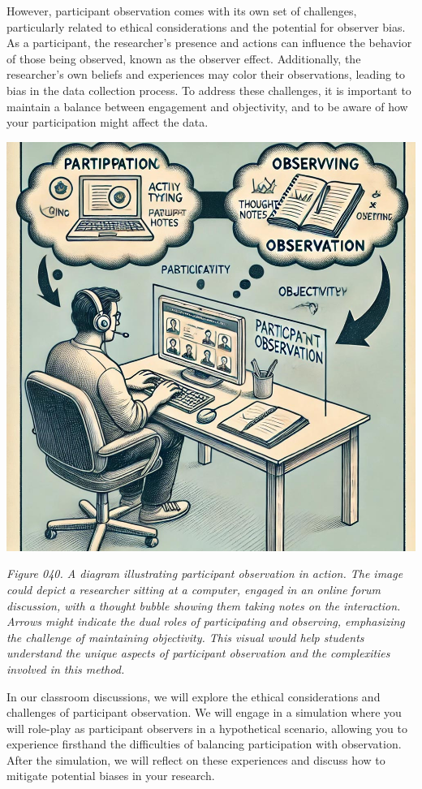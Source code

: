 \documentclass[
]{book}
\begin{document}
However, participant observation comes with its own set of challenges, particularly related to ethical considerations and the potential for observer bias. As a participant, the researcher's presence and actions can influence the behavior of those being observed, known as the observer effect. Additionally, the researcher's own beliefs and experiences may color their observations, leading to bias in the data collection process. To address these challenges, it is important to maintain a balance between engagement and objectivity, and to be aware of how your participation might affect the data.

\includegraphics[width=1\textwidth,height=\textheight]{images/fig040.jpg}

\emph{Figure 040. A diagram illustrating participant observation in action. The image could depict a researcher sitting at a computer, engaged in an online forum discussion, with a thought bubble showing them taking notes on the interaction. Arrows might indicate the dual roles of participating and observing, emphasizing the challenge of maintaining objectivity. This visual would help students understand the unique aspects of participant observation and the complexities involved in this method.}

In our classroom discussions, we will explore the ethical considerations and challenges of participant observation. We will engage in a simulation where you will role-play as participant observers in a hypothetical scenario, allowing you to experience firsthand the difficulties of balancing participation with observation. After the simulation, we will reflect on these experiences and discuss how to mitigate potential biases in your research.
\end{document}
